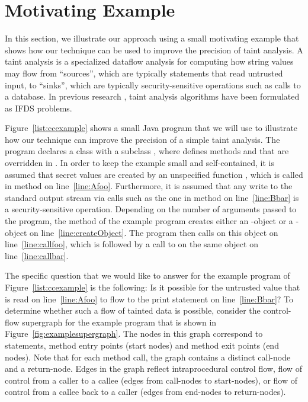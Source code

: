 \section{Motivating Example}
  \label{sec:MotivatingExample}
  
In this section, we illustrate our approach using a small motivating example that
shows how our technique can be used to improve the precision of taint analysis.
A taint analysis is a specialized dataflow analysis for computing how string values
may flow from ``sources'', which are typically statements that read untrusted input, 
to ``sinks'', which are typically security-sensitive
operations such as calls to 
a database. In previous research \cite{DBLP:conf/issta/GuarnieriPTDTB11,DBLP:conf/pldi/ArztRFBBKTOM14}, 
taint analysis algorithms have been formulated as IFDS problems.     
  

  
Figure~\ref{list:ccexample} shows a small Java program that we will use to illustrate
how our technique can improve the precision of a simple taint analysis. The program
declares a class  with a subclass ,  where  defines methods 
 and  that are overridden in .  In order to keep the 
example small and self-contained, it is assumed  that secret values are created by 
an unspecified function , which is called in method  on 
line~\ref{line:Afoo}. Furthermore, it is assumed that any write to the standard output 
stream via calls  such as the one in method  
on line~\ref{line:Bbar} is a security-sensitive operation. Depending on the number of 
arguments passed to the program, the  method of the example program creates 
either an -object or a -object on line~\ref{line:createObject}. The 
program then calls  on this object on line~\ref{line:callfoo}, which is 
followed by a call to  on the same object on line~\ref{line:callbar}.  
 
The specific question that we would like to answer for the example program of
Figure~\ref{list:ccexample} is the following: Is it possible for the untrusted value 
that is read on line~\ref{line:Afoo} to flow to the print statement on line~\ref{line:Bbar}? 
%
To determine whether such a flow of tainted data is possible, consider the control-flow
supergraph for the example program that is shown in Figure~\ref{fig:examplesupergraph}.
 The nodes in this graph correspond to statements, method entry points (start nodes) and 
method exit points (end nodes). Note that for each method call, the graph contains a 
distinct call-node and a return-node. Edges in the graph reflect intraprocedural control flow, 
flow of control from a caller to a callee (edges from call-nodes to start-nodes), or
flow of control from a callee back to a caller (edges from end-nodes to return-nodes). 


